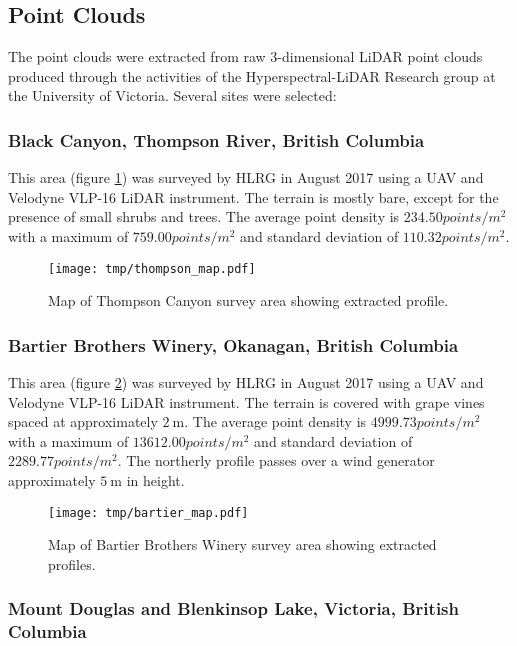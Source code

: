 \documentclass[doc]{apa6}
\begin{document}
\subsection{Point Clouds}

The point clouds were extracted from raw 3-dimensional LiDAR point clouds produced through the activities of the Hyperspectral-LiDAR Research group at the University of Victoria. Several sites were selected:

\subsubsection{Black Canyon, Thompson River, British Columbia}

This area (figure \ref{fig:thompson_map}) was surveyed by HLRG in August 2017 using a UAV and Velodyne VLP-16 LiDAR instrument. The terrain is mostly bare, except for the presence of small shrubs and trees. The average point density is $234.50points/m^2$ with a maximum of $759.00points/m^2$ and standard deviation of $110.32points/m^2$.

\begin{figure} %
\texttt{[image: tmp/thompson\_map.pdf]} 
\caption{Map of Thompson Canyon survey area showing extracted profile.}
\label{fig:thompson_map}
\end{figure}


\subsubsection{Bartier Brothers Winery, Okanagan, British Columbia}

This area (figure \ref{fig:bartier_map}) was surveyed by HLRG in August 2017 using a UAV and Velodyne VLP-16 LiDAR instrument. The terrain is covered with grape vines spaced at approximately $\SI{2}\m$. The average point density is $4999.73points/m^2$ with a maximum of $13612.00points/m^2$ and standard deviation of $2289.77points/m^2$. The northerly profile passes over a wind generator approximately $\SI{5}\m$ in height.

\begin{figure} %
\texttt{[image: tmp/bartier\_map.pdf]} 
\caption{Map of Bartier Brothers Winery survey area showing extracted profiles.}
\label{fig:bartier_map}
\end{figure}


\subsubsection{Mount Douglas and Blenkinsop Lake, Victoria, British Columbia}
\end{document}
